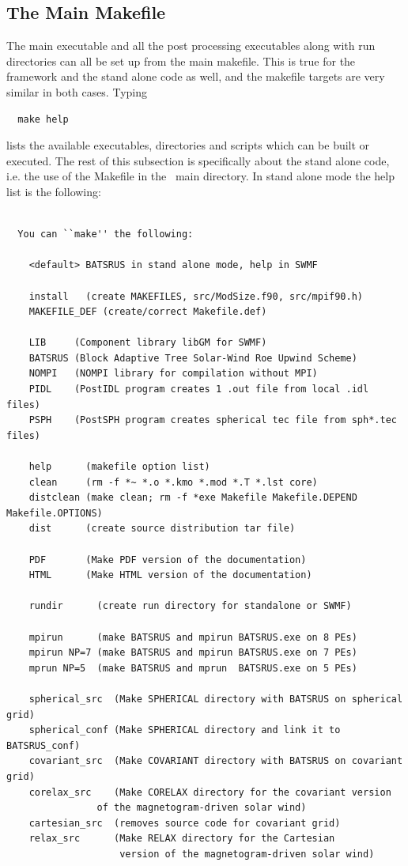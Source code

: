 \subsection{The Main Makefile \label{section:main_make}}

The main executable and all the post processing executables along
with run directories can all be set up from the main makefile.
This is true for the framework and the stand alone code as well,
and the makefile targets are very similar in both cases.
Typing
\begin{verbatim}
  make help
\end{verbatim}
lists the available executables, directories and scripts which can be built 
or executed. The rest of this subsection is specifically about the stand 
alone code, i.e. the use of the Makefile in the \BATSRUS\ main directory.
In stand alone mode the help list is the following: 
\begin{verbatim}

  You can ``make'' the following:
  
    <default> BATSRUS in stand alone mode, help in SWMF
  
    install   (create MAKEFILES, src/ModSize.f90, src/mpif90.h)
    MAKEFILE_DEF (create/correct Makefile.def)
  
    LIB     (Component library libGM for SWMF)
    BATSRUS (Block Adaptive Tree Solar-Wind Roe Upwind Scheme)
    NOMPI   (NOMPI library for compilation without MPI)
    PIDL    (PostIDL program creates 1 .out file from local .idl files)
    PSPH    (PostSPH program creates spherical tec file from sph*.tec files)
  
    help      (makefile option list)
    clean     (rm -f *~ *.o *.kmo *.mod *.T *.lst core)
    distclean (make clean; rm -f *exe Makefile Makefile.DEPEND Makefile.OPTIONS)
    dist      (create source distribution tar file)
  
    PDF       (Make PDF version of the documentation)
    HTML      (Make HTML version of the documentation)
  
    rundir      (create run directory for standalone or SWMF)
  
    mpirun      (make BATSRUS and mpirun BATSRUS.exe on 8 PEs)
    mpirun NP=7 (make BATSRUS and mpirun BATSRUS.exe on 7 PEs)
    mprun NP=5  (make BATSRUS and mprun  BATSRUS.exe on 5 PEs)
  
    spherical_src  (Make SPHERICAL directory with BATSRUS on spherical grid)
    spherical_conf (Make SPHERICAL directory and link it to BATSRUS_conf)
    covariant_src  (Make COVARIANT directory with BATSRUS on covariant grid)
    corelax_src    (Make CORELAX directory for the covariant version
                of the magnetogram-driven solar wind)
    cartesian_src  (removes source code for covariant grid)
    relax_src      (Make RELAX directory for the Cartesian
                    version of the magnetogram-driven solar wind)

\end{verbatim}
